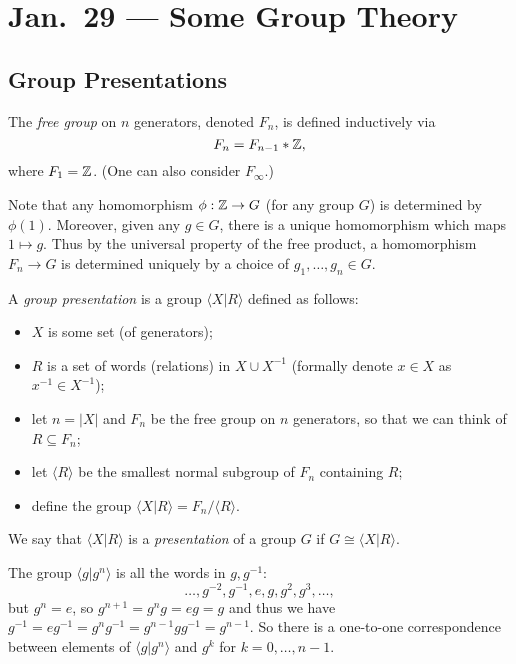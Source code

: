 \chapter{Jan.~29 --- Some Group Theory}

\section{Group Presentations}

\begin{definition}
  The \emph{free group} on $n$ generators, denoted
  $F_n$, is defined inductively via
  \[
    F_n = F_{n - 1} * \mathbb{Z},
  \]
  where $F_1 = \mathbb{Z}$. (One can also consider
  $F_\infty$.)
\end{definition}

\begin{remark}
  Note that any homomorphism $\phi : \mathbb{Z} \to G$
  (for any group $G$) is determined by $\phi(1)$.
  Moreover, given any $g \in G$, there is a unique
  homomorphism which maps $1 \mapsto g$. Thus
  by the universal property of the free product,
  a homomorphism $F_n \to G$ is determined
  uniquely by a choice of
  $g_1, \dots, g_n \in G$.
\end{remark}

\begin{definition}
  A \emph{group presentation} is a group
  $\langle X | R \rangle$ defined as follows:
  \begin{itemize}
    \item $X$ is some set (of generators);
    \item $R$ is a set of
      words (relations) in $X \cup X^{-1}$ (formally
      denote $x \in X$ as $x^{-1} \in X^{-1}$);
    \item let $n = |X|$ and $F_n$ be the free group
      on $n$ generators, so that we can think of
      $R \subseteq F_n$;
    \item let $\langle R \rangle$ be the smallest
      normal subgroup of $F_n$ containing $R$;
    \item define the group
      $\langle X | R \rangle = F_n / \langle R \rangle$.
  \end{itemize}
  We say that $\langle X | R \rangle$ is a \emph{presentation} of
  a group $G$ if $G \cong \langle X | R \rangle$.
\end{definition}

\begin{example}
  The group $\langle g | g^n \rangle$ is all the words
  in $g, g^{-1}$:
  \[
    \dots, g^{-2}, g^{-1}, e, g, g^2, g^3, \dots,
  \]
  but $g^n = e$, so $g^{n + 1} = g^n g = eg = g$
  and thus we have $g^{-1} = eg^{-1} = g^n g^{-1} = g^{n - 1} g g^{-1} = g^{n - 1}$.
  So there is a one-to-one correspondence between
  elements of $\langle g | g^n \rangle$ and
  $g^k$ for $k = 0, \dots, n - 1$.
\end{example}

